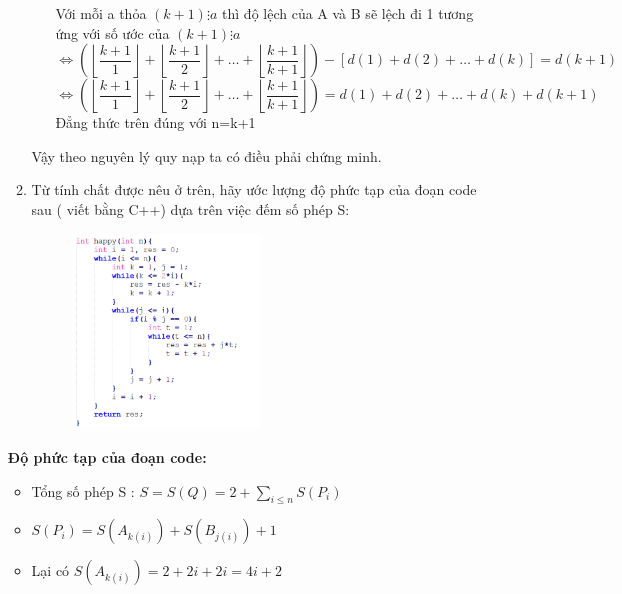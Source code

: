 \documentclass[12pt,a4paper]{article}
\begin{document}
\begin{enumerate}[label=\textbf{Câu 1:} ]
\begin{enumerate}[label=\alph*)]
\begin{itemize}[label=$\bullet$]
                              Với  mỗi  a thỏa  $(k+1)\vdots a $ thì độ lệch của  A và B sẽ lệch đi 1  tương ứng với số ước của $(k+1)\vdots a $
                              \[
                                  \Leftrightarrow\left( \left\lfloor \frac{k+1}{1} \right\rfloor + \left\lfloor \frac{k+1}{2} \right\rfloor + \ldots + \left\lfloor \frac{k+1}{k+1} \right\rfloor \right) - [d(1) + d(2) + \ldots + d(k)] = d(k+1)
                              \]
\[
                                  \Leftrightarrow\left( \left\lfloor \frac{k+1}{1} \right\rfloor + \left\lfloor \frac{k+1}{2} \right\rfloor + \ldots + \left\lfloor \frac{k+1}{k+1} \right\rfloor \right) = d(1) + d(2) + \ldots + d(k) + d(k+1)
                              \]
Đẳng thức trên đúng với n=k+1

                    \end{itemize}
                    Vậy theo nguyên lý quy nạp ta có điều phải chứng minh.
              \item Từ tính chất được nêu ở trên, hãy ước lượng độ phức tạp của đoạn code sau ( viết  bằng C++) dựa trên việc đếm số phép S:
                    \begin{figure}[h] %
                        \centering
                        \includegraphics[width=0.5\textwidth]{img1.png} %
                        \label{fig:hinh_anh}
                    \end{figure}
          \end{enumerate}
          \textbf{Độ phức tạp của đoạn code:}
          \begin{itemize}[label=$\bullet$]
          \item Tổng số phép S : $S=S(Q)=2+\sum_{i \le n} S(P_i)$
          \item $S(P_i) = S(A_{k(i)}) + S(B_{j(i)}) + 1$
          \item Lại có $S(A_{k(i)}) =  2 + 2i + 2i = 4i + 2$

\end{itemize}
\end{enumerate}
\end{document}
